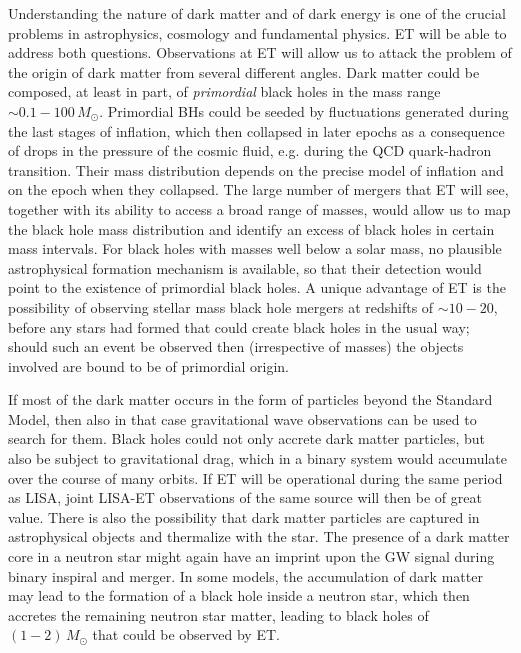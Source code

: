 Understanding the nature of dark matter and of dark energy is one of the crucial problems in astrophysics, cosmology and fundamental physics.  ET will be able to address both questions. 
Observations at ET will allow us to attack the problem of the origin of dark matter from several different angles. Dark matter could be composed, at least in part, of \emph{primordial} black holes in the mass range $\sim 0.1 - 100\,M_\odot$.
Primordial BHs  could be seeded by fluctuations generated during the 
last stages of inflation, which then collapsed in later epochs as a consequence of drops in the pressure of the cosmic fluid, e.g. during the  QCD quark-hadron transition. Their mass distribution depends on the precise model 
of inflation and on the epoch when they  collapsed. The large number of mergers that ET
will see, together with its  ability to access a broad range of masses, would allow us to map the black hole mass distribution
and identify an excess of black holes in certain mass intervals. For black holes with masses well below a 
solar mass, no plausible astrophysical formation mechanism is available, so that their detection would
point to the existence of primordial black holes. A unique advantage of ET is the possibility of observing stellar mass black hole mergers at redshifts of $\sim 10-20$, before any stars had formed that could create black holes in the usual way; 
should such an event be observed then (irrespective of masses) the objects involved are bound to be of primordial origin.

If most of the dark matter occurs in the form of particles beyond the Standard Model, then also in that case gravitational wave observations can be used to search for them. Black holes could not only accrete dark matter particles, but also be subject to gravitational drag, which in a binary system would accumulate over the course of many orbits. 
If ET will be operational during the same period as LISA, joint LISA-ET observations of the same source will then be of great value.
There is also the possibility that dark matter particles are captured in astrophysical objects and thermalize with the star.
The presence of a dark matter core in a neutron star might again have an imprint upon the GW signal during binary inspiral and merger.
In some models,
the accumulation of dark matter may lead to the formation of a black hole inside a neutron star, which then accretes the remaining neutron star matter, leading to black holes of $(1-2) \,M_\odot$ that could be observed by ET.

